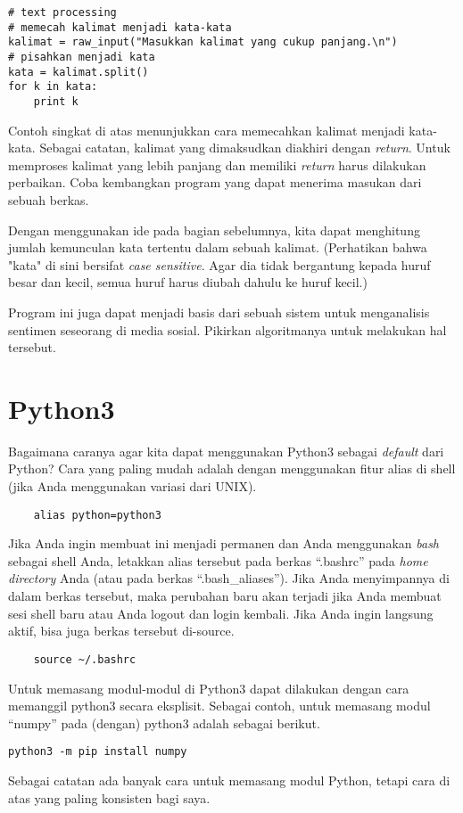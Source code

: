 \begin{verbatim}
# text processing
# memecah kalimat menjadi kata-kata
kalimat = raw_input("Masukkan kalimat yang cukup panjang.\n")
# pisahkan menjadi kata
kata = kalimat.split()
for k in kata:
    print k
\end{verbatim}

Contoh singkat di atas menunjukkan cara memecahkan kalimat menjadi kata-kata.
Sebagai catatan, kalimat yang dimaksudkan diakhiri dengan {\em return}. 
Untuk memproses kalimat yang lebih panjang dan memiliki {\em return} harus 
dilakukan perbaikan.
Coba kembangkan program yang dapat menerima masukan dari sebuah berkas.

Dengan menggunakan ide pada bagian sebelumnya, kita dapat menghitung
jumlah kemunculan kata tertentu dalam sebuah kalimat. (Perhatikan bahwa
"kata" di sini bersifat {\em case sensitive}. Agar dia tidak bergantung
kepada huruf besar dan kecil, semua huruf harus diubah dahulu ke
huruf kecil.)

Program ini juga dapat menjadi basis dari sebuah sistem untuk menganalisis
sentimen seseorang di media sosial. Pikirkan algoritmanya untuk melakukan
hal tersebut.


\section{Python3}
Bagaimana caranya agar kita dapat menggunakan Python3 sebagai {\em default}
dari Python? Cara yang paling mudah adalah dengan menggunakan fitur
alias di shell (jika Anda menggunakan variasi dari UNIX).

\begin{verbatim}
    alias python=python3
\end{verbatim}

Jika Anda ingin membuat ini menjadi permanen dan Anda menggunakan {\em bash}
sebagai shell Anda, letakkan alias tersebut pada berkas ``.bashrc'' pada
{\em home directory} Anda (atau pada berkas ``.bash\_aliases''). 
Jika Anda menyimpannya di dalam berkas tersebut, maka perubahan baru akan 
terjadi jika Anda membuat sesi shell baru atau Anda logout dan login kembali.
Jika Anda ingin langsung aktif, bisa juga berkas tersebut di-source.

\begin{verbatim}
    source ~/.bashrc
\end{verbatim}
    
Untuk memasang modul-modul di Python3 dapat dilakukan dengan cara
memanggil python3 secara eksplisit. Sebagai contoh, untuk memasang
modul ``numpy'' pada (dengan) python3 adalah sebagai berikut.

\begin{verbatim}
python3 -m pip install numpy
\end{verbatim}

Sebagai catatan ada banyak cara untuk memasang modul Python, tetapi
cara di atas yang paling konsisten bagi saya.
